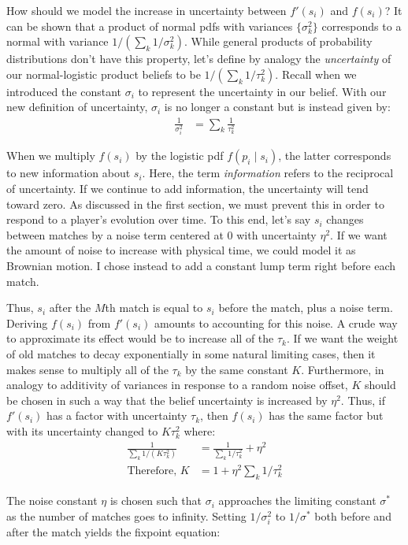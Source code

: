 \documentclass{article}
\begin{document}
How should we model the increase in uncertainty between $f'(s_i)$ and $f(s_i)$? It can be shown that a product of normal pdfs with variances $\{\sigma_k^2\}$ corresponds to a normal with variance $1/(\sum_k 1/\sigma_k^2)$. While general products of probability distributions don't have this property, let's define by analogy the \emph{uncertainty} of our normal-logistic product beliefs to be $1/(\sum_k 1/\tau_k^2)$. Recall when we introduced the constant $\sigma_i$ to represent the uncertainty in our belief. With our new definition of uncertainty, $\sigma_i$ is no longer a constant but is instead given by:
\begin{align}
\frac{1}{\sigma_i^2} &= \sum_k \frac{1}{\tau_k^2}
\end{align}

When we multiply $f(s_i)$ by the logistic pdf $f(p_i \mid s_i)$, the latter corresponds to new information about $s_i$. Here, the term \emph{information} refers to the reciprocal of uncertainty. If we continue to add information, the uncertainty will tend toward zero. As discussed in the first section, we must prevent this in order to respond to a player's evolution over time. To this end, let's say $s_i$ changes between matches by a noise term centered at $0$ with uncertainty $\eta^2$. If we want the amount of noise to increase with physical time, we could model it as Brownian motion. I chose instead to add a constant lump term right before each match.

Thus, $s_i$ after the $M$th match is equal to $s_i$ before the match, plus a noise term. Deriving $f(s_i)$ from $f'(s_i)$ amounts to accounting for this noise. A crude way to approximate its effect would be to increase all of the $\tau_k$. If we want the weight of old matches to decay exponentially in some natural limiting cases, then it makes sense to multiply all of the $\tau_k$ by the same constant $K$. Furthermore, in analogy to additivity of variances in response to a random noise offset, $K$ should be chosen in such a way that the belief uncertainty is increased by $\eta^2$. Thus, if $f'(s_i)$ has a factor with uncertainty $\tau_k$, then $f(s_i)$ has the same factor but with its uncertainty changed to $K\tau_k^2$ where:
\begin{align}
\frac{1}{\sum_k 1/(K\tau_k^2)} &= \frac{1}{\sum_k 1/\tau_k^2} + \eta^2
\\ \text{Therefore, }K &= 1 + \eta^2\sum_k 1/\tau_k^2
\end{align}

The noise constant $\eta$ is chosen such that $\sigma_i$ approaches the limiting constant $\sigma^*$ as the number of matches goes to infinity. Setting $1/\sigma_i^2$ to $1/\sigma^*$ both before and after the match yields the fixpoint equation:
\end{document}
